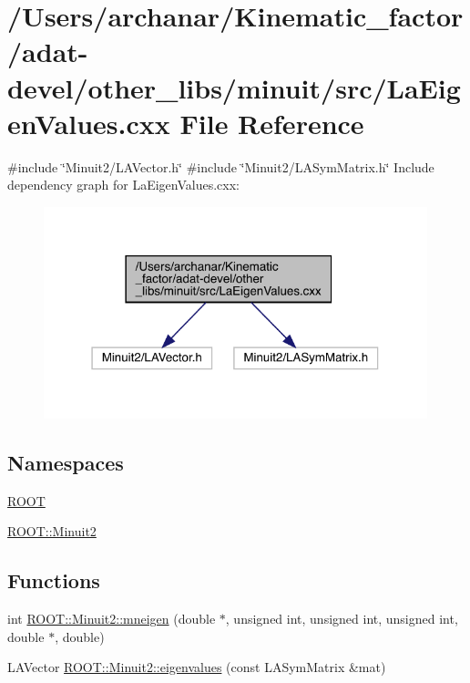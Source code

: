 \hypertarget{adat-devel_2other__libs_2minuit_2src_2LaEigenValues_8cxx}{}\section{/\+Users/archanar/\+Kinematic\+\_\+factor/adat-\/devel/other\+\_\+libs/minuit/src/\+La\+Eigen\+Values.cxx File Reference}
\label{adat-devel_2other__libs_2minuit_2src_2LaEigenValues_8cxx}
{\ttfamily \#include \char`\"{}Minuit2/\+L\+A\+Vector.\+h\char`\"{}}\newline
{\ttfamily \#include \char`\"{}Minuit2/\+L\+A\+Sym\+Matrix.\+h\char`\"{}}\newline
Include dependency graph for La\+Eigen\+Values.\+cxx\+:
\nopagebreak
\begin{figure}[H]
\begin{center}
\leavevmode
\includegraphics[width=316pt]{d6/de8/adat-devel_2other__libs_2minuit_2src_2LaEigenValues_8cxx__incl}
\end{center}
\end{figure}
\subsection*{Namespaces}
\begin{DoxyCompactItemize}
\item 
 \mbox{\hyperlink{namespaceROOT}{R\+O\+OT}}
\item 
 \mbox{\hyperlink{namespaceROOT_1_1Minuit2}{R\+O\+O\+T\+::\+Minuit2}}
\end{DoxyCompactItemize}
\subsection*{Functions}
\begin{DoxyCompactItemize}
\item 
int \mbox{\hyperlink{namespaceROOT_1_1Minuit2_a4a6b91c57b107c48f582569401bb12e9}{R\+O\+O\+T\+::\+Minuit2\+::mneigen}} (double $\ast$, unsigned int, unsigned int, unsigned int, double $\ast$, double)
\item 
L\+A\+Vector \mbox{\hyperlink{namespaceROOT_1_1Minuit2_a1569bf99d4c46944433c0b5bb02b3ad6}{R\+O\+O\+T\+::\+Minuit2\+::eigenvalues}} (const L\+A\+Sym\+Matrix \&mat)
\end{DoxyCompactItemize}
